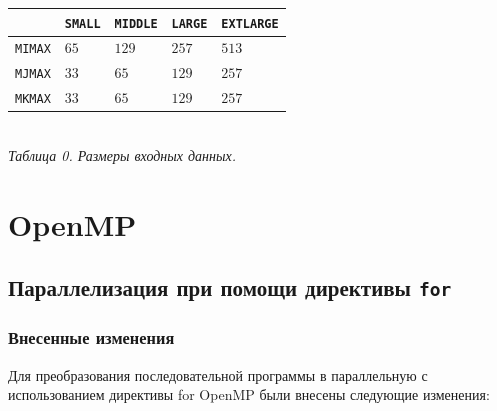 \documentclass[a4paper, 11pt]{article}
\begin{document}
\vspace{0.3cm}

\begin{center}
    \begin{tabular}{l|l l l l}
            & \texttt{SMALL} & \texttt{MIDDLE} & \texttt{LARGE} & \texttt{EXTLARGE} \\
            \hline
            \texttt{MIMAX} & $65$   & $129$  & $257$  & $513$ \\
            \texttt{MJMAX} & $33$   & $65$   & $129$  & $257$ \\
            \texttt{MKMAX} & $33$   & $65$   & $129$  & $257$ \\
    \end{tabular} \\
    \vspace{0.3cm}
    \small \it
    Таблица 0. Размеры входных данных.
\end{center}
\newpage


\section*{OpenMP}
\subsection*{Параллелизация при помощи директивы \texttt{for}}

\subsubsection*{Внесенные изменения}

Для преобразования последовательной программы в параллельную с использованием директивы for OpenMP были внесены следующие изменения:
\end{document}
